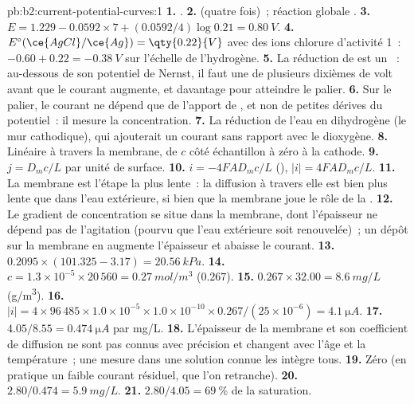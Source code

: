 \begin{solution}{pb:b2:current-potential-curves:1}
\textbf{1.} .
\textbf{2.}  (quatre fois)~; réaction globale .
\textbf{3.} $E = 1.229 - 0.0592 \times 7 + (0.0592/4)\log 0.21 = \qty{0.80}{V}$.
\textbf{4.} $E^\circ(\ce{AgCl}/\ce{Ag}) = \qty{0.22}{V}$ avec des ions chlorure d'activité 1~:
$-0.60 + 0.22 = \qty{-0.38}{V}$ sur l'échelle de l'hydrogène.
\textbf{5.} La réduction de  est un ~: au-dessous de son potentiel de Nernst,
il faut une  de plusieurs dixièmes de volt avant que le courant
augmente, et davantage pour atteindre le palier.
\textbf{6.} Sur le palier, le courant ne dépend que de l'apport de ,
et non de petites dérives du potentiel~: il mesure la concentration.
\textbf{7.} La réduction de l'eau en dihydrogène (le mur cathodique), qui
ajouterait un courant sans rapport avec le dioxygène.
\textbf{8.} Linéaire à travers la membrane, de $c$ côté échantillon à zéro à
la cathode.
\textbf{9.} $j = D_m c/L$ par unité de surface.
\textbf{10.} $i = -4FAD_m c/L$ (), $|i| = 4FAD_mc/L$.
\textbf{11.} La membrane est l'étape la plus lente~: la diffusion à travers elle est bien
plus lente que dans l'eau extérieure, si bien que la membrane joue le rôle de la
.
\textbf{12.} Le gradient de concentration se situe dans la membrane, dont l'épaisseur
ne dépend pas de l'agitation (pourvu que l'eau extérieure soit renouvelée)~;
un dépôt sur la membrane en augmente l'épaisseur et abaisse le courant.
\textbf{13.} $0.2095 \times (101.325 - 3.17) = \qty{20.56}{kPa}$.
\textbf{14.} $c = 1.3 \times 10^{-5} \times 20\,560 = \qty{0.27}{mol/m^3}$ ($0.267$).
\textbf{15.} $0.267 \times 32.00 = \qty{8.6}{mg/L}$ (\unit{g/m^3}).
\textbf{16.} $|i| = 4 \times 96\,485 \times 1.0 \times 10^{-5} \times 1.0 \times 10^{-10}
\times 0.267/(25 \times 10^{-6}) = \qty{4.1}{\micro A}$.
\textbf{17.} $4.05/8.55 = \qty{0.474}{\micro A}$ par \unit{mg/L}.
\textbf{18.} L'épaisseur de la membrane et son coefficient de diffusion ne sont pas connus
avec précision et changent avec l'âge et la température~; une mesure dans une solution
connue les intègre tous.
\textbf{19.} Zéro (en pratique un faible courant résiduel, que l'on retranche).
\textbf{20.} $2.80/0.474 = \qty{5.9}{mg/L}$.
\textbf{21.} $2.80/4.05 = 69~\%$ de la saturation.

\end{solution}

